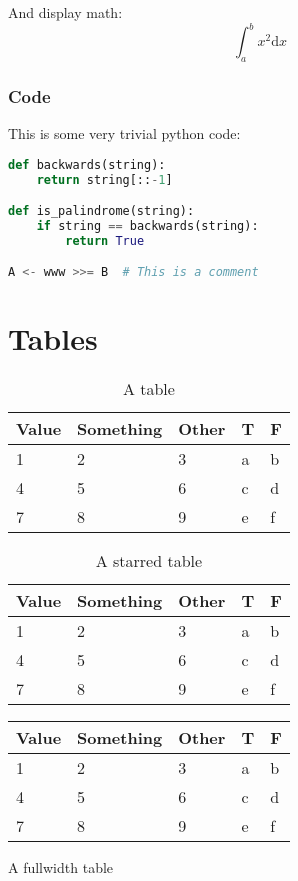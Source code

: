 \documentclass{jcls}
\begin{document}
And display math:
\[
	\int_a^b x^2  \mathrm{d} x
\]

\subsubsection{Code}

This is some very trivial python code:

\begin{lstlisting}[language=Python]
def backwards(string):
    return string[::-1]

def is_palindrome(string):
    if string == backwards(string): 
		return True

A <- www >>= B  # This is a comment
\end{lstlisting}

\section{Tables}

\begin{table}[ht]
	\begin{tabular}{@{}lllll@{}}
		Value & Something & Other & T & F \\ \midrule
		1     & 2         & 3     & a & b \\
		4     & 5         & 6     & c & d \\
		7     & 8         & 9     & e & f \\
	\end{tabular}
	\caption{A table}
\end{table}

\begin{table*}
	\begin{tabular}{@{}lllll@{}}
		Value & Something & Other & T & F \\ \midrule
		1     & 2         & 3     & a & b \\
		4     & 5         & 6     & c & d \\
		7     & 8         & 9     & e & f \\
	\end{tabular}
	\caption{A starred table}
\end{table*}

\begin{fullwidthtable}
	\begin{tabular}{@{}lllll@{}}
		Value & Something & Other & T & F \\ \midrule
		1     & 2         & 3     & a & b \\
		4     & 5         & 6     & c & d \\
		7     & 8         & 9     & e & f \\
	\end{tabular}
	\caption{A fullwidth table}
\end{fullwidthtable}
\end{document}

